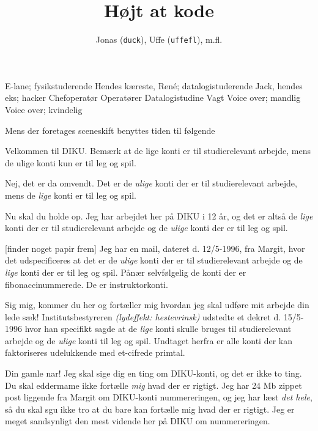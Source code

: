 \documentclass[danish]{article}
\title{Højt at kode}
\author{Jonas (\texttt{duck}), Uffe (\texttt{uffefl}), m.fl.}
\begin{document}
\maketitle

\begin{roles}
   E-lane; fysikstuderende
   Hendes kæreste, Ren\'e; datalogistuderende
   Jack, hendes eks; hacker
   Chefoperatør
   Operatører
   Datalogistudine
   Vagt
   Voice over; mandlig
   Voice over; kvindelig
\end{roles}

\begin{sketch}

\scene Mens der foretages sceneskift benyttes tiden til følgende

 Velkommen til DIKU. Bemærk at de lige konti er til studierelevant arbejde, mens de ulige konti kun er til leg og spil.

 Nej, det er da omvendt. Det er de \emph{ulige} konti der er til
studierelevant arbejde, mens de \emph{lige} konti er til leg og spil.

 Nu skal du holde op. Jeg har arbejdet her på DIKU i 12 år, og det er
altså de \emph{lige} konti der er til studierelevant arbejde og de \emph{ulige}
konti der er til leg og spil.

[finder noget papir frem] Jeg har en mail, dateret d. 12/5-1996, fra
Margit, hvor det udspecificeres at det er de \emph{ulige} konti der er til
studierelevant arbejde og de \emph{lige} konti der er til leg og spil. Pånær
selvfølgelig de konti der er fibonaccinummerede. De er instruktorkonti.

 Sig mig, kommer du her og fortæller mig hvordan jeg skal udføre mit
arbejde din lede sæk! Institutsbestyreren \emph{(lydeffekt: hestevrinsk)}
udstedte et dekret d. 15/5-1996 hvor han specifikt sagde at de \emph{lige} konti
skulle bruges til studierelevant arbejde og de \emph{ulige} konti til leg og
spil. Undtaget herfra er alle konti der kan faktoriseres udelukkende med
et-cifrede primtal.

 Din gamle nar! Jeg skal sige dig en ting om DIKU-konti, og det er
ikke to ting. Du skal eddermame ikke fortælle \emph{mig} hvad der er rigtigt.
Jeg har 24 Mb zippet post liggende fra Margit om DIKU-konti nummereringen, og
jeg har læst \emph{det hele}, så du skal sgu ikke tro at du bare kan fortælle
mig hvad der er rigtigt. Jeg er meget sandsynligt den mest vidende her på DIKU
om nummereringen.


\end{sketch}
\end{document}
